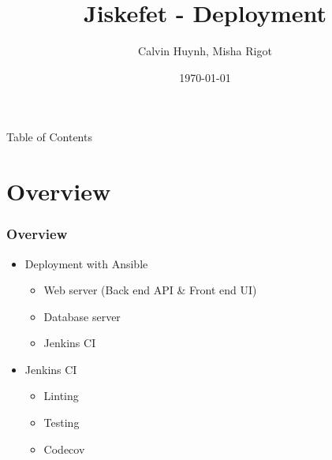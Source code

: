 \documentclass[12pt]{beamer}
\title{Jiskefet - Deployment}
\author{Calvin Huynh, Misha Rigot}
\date{\today}
\begin{document}
	\begin{frame}
	    \titlepage
	\end{frame}

	\begin{frame}{Table of Contents}
		\tableofcontents
	\end{frame}

	\section{Overview}
	\begin{frame}
        \frametitle{Overview}
		\begin{itemize}
			\item Deployment with Ansible
			\begin{itemize}
                \item Web server (Back end API \& Front end UI)
                \item Database server
                \item Jenkins CI
            \end{itemize} 
			\item Jenkins CI
            \begin{itemize}
                \item Linting
                \item Testing
                \item Codecov
            \end{itemize}
		\end{itemize}
    \end{frame}

\end{document}
